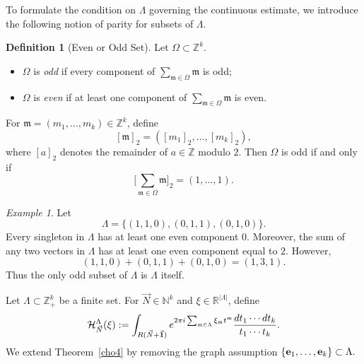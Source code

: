 \documentclass[11 pt,letterpaper]{amsart}
\theoremstyle{plain}
\theoremstyle{definition}
\newtheorem{definition}{Definition}\numberwithin{definition}{section}
\theoremstyle{remark} \theoremstyle{exam} \theoremstyle{ob}
\newtheorem{exam}{Example}\numberwithin{exam}{section}
\numberwithin{equation}{section}
\begin{document}
To formulate the condition on $\Lambda$ governing the continuous
estimate, we introduce the following notion of parity for subsets of
$\Lambda$.
\begin{definition}[Even or Odd Set]\label{14a}
	Let $\Omega\subset \mathbb{Z}^k$. 
	
	\begin{itemize}
		\item
		$\Omega$ is \emph{odd} if every component of
		$\sum_{\mathfrak m\in\Omega}\mathfrak m$
		is odd;
		
		\item
		$\Omega$ is \emph{even} if at least one component of
		$\sum_{\mathfrak m\in\Omega}\mathfrak m$
		is even.
	\end{itemize}
	
	For $\mathfrak m=(m_1,\dots,m_k)\in\mathbb Z^k$, define
	\[
	[\mathfrak m]_2=([m_1]_2,\dots,[m_k]_2),
	\]
	where $[a]_2$ denotes the remainder of $a\in\mathbb Z$ modulo $2$.
	Then $\Omega$ is odd if and only if
	\[
	\Big[\sum_{\mathfrak m\in\Omega}\mathfrak m\Big]_2=(1,\dots,1).
	\]
\end{definition}


\begin{exam}\label{eexx1}
	Let
	\[
	\Lambda=\{(1,1,0),(0,1,1),(0,1,0)\}.
	\]
	Every singleton in $\Lambda$ has at least one even component $0$.
	Moreover, the sum of any two vectors in $\Lambda$ has at least one even component equal to $2$.
	However,
	\[
	(1,1,0)+(0,1,1)+(0,1,0)=(1,3,1).
	\]
	Thus the only odd subset of $\Lambda$ is $\Lambda$ itself.
\end{exam}

Let $\Lambda\subset\mathbb Z_+^k$ be a finite set. For
$\vec N\in\mathbb N^k$ and
$\xi\in\mathbb R^{|\Lambda|}$, define
\[
\mathcal H_{\vec N}^{\Lambda}(\xi)
:=
\int_{R(\vec N+\vec{\bf{1}})}
e^{2\pi i\sum_{\mathfrak m\in\Lambda}
	\xi_{\mathfrak m}t^{\mathfrak m}}
\frac{dt_1\cdots dt_k}{t_1\cdots t_k}.
\]
We extend Theorem~\ref{cho4} by removing the graph
assumption
$
\{{\bf e}_1,\ldots,{\bf e}_k\}\subset\Lambda.
$
\end{document}
